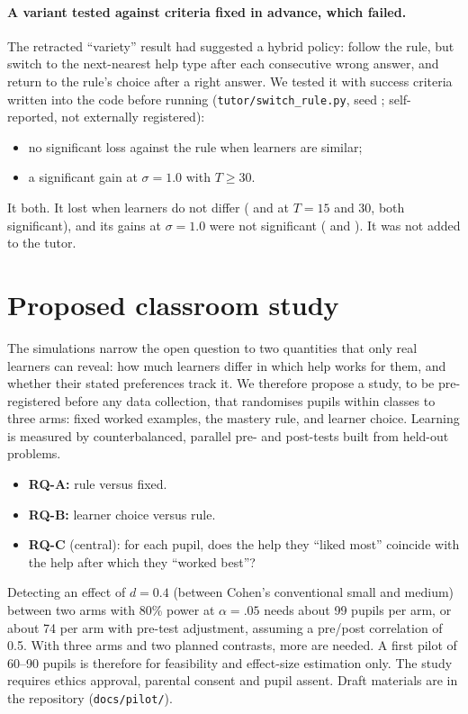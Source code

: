 \documentclass[11pt,a4paper]{article}
\begin{document}
\paragraph{A variant tested against criteria fixed in advance, which failed.}
The retracted ``variety'' result had suggested a hybrid policy: follow the rule, but switch
to the next-nearest help type after each consecutive wrong answer, and return to the rule's
choice after a right answer. We tested it with success criteria written into the code
before running (\texttt{tutor/switch\_rule.py}, seed \numSwitchSeed; self-reported, not
externally registered):
\begin{itemize}
  \item[(a)] no significant loss against the rule when learners are similar;
  \item[(b)] a significant gain at $\sigma = 1.0$ with $T \geq 30$.
\end{itemize}
It \textbf{\numSwitchPassed} both. It lost when learners do not differ (\numSwitchSimFifteen{}
and \numSwitchSimThirty{} at $T = 15$ and 30, both significant), and its gains at
$\sigma = 1.0$ were not significant (\numSwitchDiffThirty{} and \numSwitchDiffSixty{}). It
was not added to the tutor.

\section{Proposed classroom study}
\label{sec:proposed}
The simulations narrow the open question to two quantities that only real learners can
reveal: how much learners differ in which help works for them, and whether their stated
preferences track it. We therefore propose a study, to be pre-registered before any data
collection, that randomises pupils within classes to three arms: fixed worked examples, the mastery rule, and learner choice.
Learning is measured by counterbalanced, parallel pre- and post-tests built from held-out
problems.
\begin{itemize}
  \item \textbf{RQ-A:} rule versus fixed.
  \item \textbf{RQ-B:} learner choice versus rule.
  \item \textbf{RQ-C} (central): for each pupil, does the help they ``liked most'' coincide
        with the help after which they ``worked best''?
\end{itemize}

Detecting an effect of $d = 0.4$ (between Cohen's conventional small and medium) between two
arms with 80\% power at $\alpha = .05$ needs about 99 pupils per arm, or about 74 per arm
with pre-test adjustment, assuming a pre/post correlation of 0.5. With three arms and two
planned contrasts, more are needed. A first pilot of 60--90 pupils is therefore for feasibility and
effect-size estimation only. The study requires ethics approval, parental consent and pupil
assent. Draft materials are in the repository (\texttt{docs/pilot/}).
\end{document}
